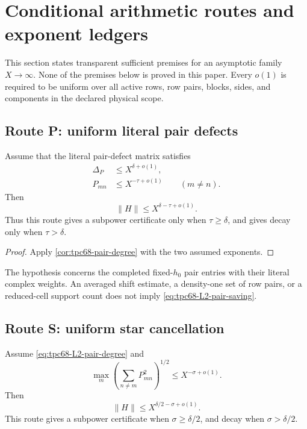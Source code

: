 \section{Conditional arithmetic routes and exponent ledgers}
\label{sec:tpc68-conditional-arithmetic}

This section states transparent sufficient premises for an asymptotic
family \(X\to\infty\).  None of the premises below is proved in this paper.
Every \(o(1)\) is required to be uniform over all active rows, row pairs,
blocks, sides, and components in the declared physical scope.

\subsection{Route P: uniform literal pair defects}

\begin{proposition}
\label{prop:tpc68-conditional-pair}
Assume that the literal pair-defect matrix satisfies
\begin{align}
 \Delta_P&\le X^{\delta+o(1)},
 \label{eq:tpc68-L2-pair-degree}\\
 P_{mn}&\le X^{-\tau+o(1)}
 \qquad(m\ne n).
 \label{eq:tpc68-L2-pair-saving}
\end{align}
Then
\begin{equation}
 \|H\|
 \le X^{\delta-\tau+o(1)}.
 \label{eq:tpc68-pair-exponent-output}
\end{equation}
Thus this route gives a subpower certificate only when
\(\tau\ge\delta\), and gives decay only when \(\tau>\delta\).
\end{proposition}

\begin{proof}
Apply \cref{cor:tpc68-pair-degree} with the two assumed exponents.
\end{proof}

The hypothesis concerns the completed fixed-\(h_0\) pair entries with
their literal complex weights.  An averaged shift estimate, a density-one
set of row pairs, or a reduced-cell support count does not imply
\eqref{eq:tpc68-L2-pair-saving}.

\subsection{Route S: uniform star cancellation}

\begin{proposition}
\label{prop:tpc68-conditional-star}
Assume \eqref{eq:tpc68-L2-pair-degree} and
\begin{equation}
 \max_m\left(\sum_{n\ne m}P_{mn}^2\right)^{1/2}
 \le X^{-\sigma+o(1)}.
 \label{eq:tpc68-L2-star-saving}
\end{equation}
Then
\begin{equation}
 \|H\|
 \le X^{\delta/2-\sigma+o(1)}.
 \label{eq:tpc68-star-exponent-output}
\end{equation}
This route gives a subpower certificate when
\(\sigma\ge\delta/2\), and decay when \(\sigma>\delta/2\).
\end{proposition}

